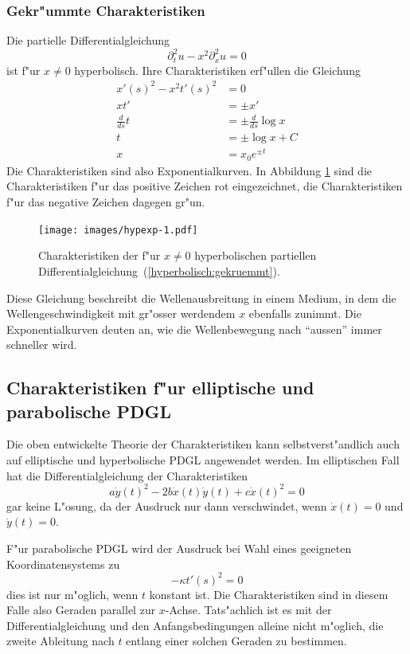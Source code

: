 \subsubsection{Gekr"ummte Charakteristiken}
Die partielle Differentialgleichung
\begin{equation}
\partial_t^2u-x^2\partial_x^2u=0
\label{hyperbolisch:gekruemmt}
\end{equation}
ist f"ur $x\ne 0$ hyperbolisch.
Ihre Charakteristiken erf"ullen die Gleichung
\begin{align*}
x'(s)^2-x^2t'(s)^2&=0
\\
xt'&=\pm  x'
\\
\frac{d}{ds}t&=\pm\frac{d}{ds}\log x
\\
t&=\pm\log x+C
\\
x&=x_0e^{\pm t}
\end{align*}
Die Charakteristiken sind also Exponentialkurven. In Abbildung \ref{hyp:exp}
sind die Charakteristiken f"ur das positive Zeichen rot eingezeichnet, die
Charakteristiken f"ur das negative Zeichen dagegen gr"un.
\begin{figure}
\begin{center}
\texttt{[image: images/hypexp-1.pdf]}
\end{center}
\caption{Charakteristiken der f"ur $x\ne 0$ hyperbolischen
partiellen Differentialgleichung~(\ref{hyperbolisch:gekruemmt}).
\label{hyp:exp}}
\end{figure}

Diese Gleichung beschreibt die Wellenausbreitung in einem Medium,
in dem die Wellengeschwindigkeit mit gr"osser werdendem $x$ ebenfalls
zunimmt. Die Exponentialkurven deuten an, wie die Wellenbewegung nach ``aussen''
immer schneller wird.

\subsection{Charakteristiken f"ur elliptische und parabolische PDGL}
Die oben entwickelte Theorie der Charakteristiken kann selbstverst"andlich
auch auf elliptische und hyperbolische PDGL angewendet werden.
Im elliptischen Fall hat die Differentialgleichung der Charakteristiken
\[
a\dot y(t)^2-2b\dot x(t)\dot y(t)+c\dot x(t)^2=0
\]
gar keine L"osung, da der Ausdruck nur dann verschwindet, wenn $\dot x(t)=0$
und $\dot y(t)=0$.

F"ur parabolische PDGL wird der Ausdruck bei Wahl eines geeigneten
Koordinatensystems zu
\[
-\kappa t'(s)^2=0
\]
dies ist nur m"oglich, wenn $t$ konstant ist. Die Charakteristiken
sind in diesem Falle also Geraden parallel zur $x$-Achse.
Tats"achlich ist es mit der Differentialgleichung und
den Anfangsbedingungen alleine nicht
m"oglich, die zweite Ableitung nach $t$ entlang einer solchen Geraden
zu bestimmen.

